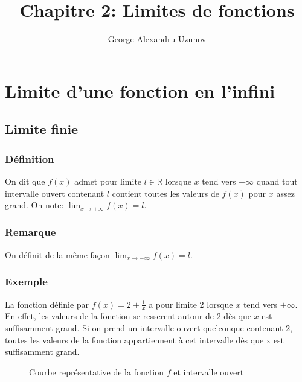 \documentclass[9pt,twoside]{article}
\title{Chapitre 2: Limites de fonctions}
\author{George Alexandru Uzunov}
\date{}
\begin{document}
\maketitle
\tableofcontents\newpage

\section{Limite d'une fonction en l'infini}

\subsection{Limite finie}

\subsubsection*{\underline{Définition}}

On dit que $f(x)$ admet pour limite $l \in \mathbb{R}$ lorsque $x$ tend vers $+\infty$ quand tout intervalle ouvert contenant $l$ contient toutes les valeurs de $f(x)$ pour $x$ assez grand. On note: $\lim_{x \to +\infty}f(x) = l$.

\subsubsection*{Remarque}

On définit de la même façon $\lim_{x \to -\infty}f(x)=l$.

\subsubsection*{Exemple}

La fonction définie par $f(x)=2+\frac{1}{x}$ a pour limite 2 lorsque $x$ tend vers $+\infty$. \\ En effet, les valeurs de la fonction se resserent autour de 2 dès que $x$ est suffisamment grand. Si on prend un intervalle ouvert quelconque contenant 2, toutes les valeurs de la fonction appartiennent à cet intervalle dès que x est suffisamment grand.

\begin{figure}[H]
	\centering
	\caption{Courbe représentative de la fonction $f$ et intervalle ouvert}
\end{figure}
\end{document}
